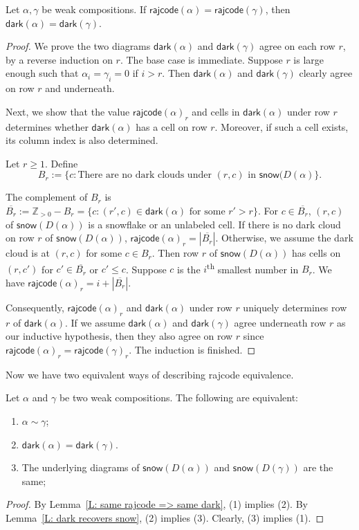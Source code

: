 \documentclass[ALCO]{cedram}
\newcommand{\dark}{\mathsf{dark}}
\newcommand{\snow}{\mathsf{snow}}
\newcommand{\rajcode}{\mathsf{rajcode}}
\begin{document}
\begin{lemma}
\label{L: same rajcode => same dark}
Let $\alpha, \gamma$ be weak compositions.
If $\rajcode(\alpha) = \rajcode(\gamma)$,
then $\dark(\alpha) = \dark(\gamma)$.
\end{lemma}
\begin{proof}
We prove the two diagrams $\dark(\alpha)$ 
and $\dark(\gamma)$ agree on each row $r$,
by a reverse induction on $r$.
The base case is immediate.
Suppose $r$ is large enough
such that $\alpha_i = \gamma_i = 0$
if $i > r$.
Then $\dark(\alpha)$ and $\dark(\gamma)$
clearly agree on row $r$ and underneath.

Next, we show that the value $\rajcode(\alpha)_r$ and cells in $\dark(\alpha)$ under row $r$ 
determines whether $\dark(\alpha)$ has a cell on row $r$.
Moreover, if such a cell exists, its column index is also determined. 

Let $r\geqslant 1$.
Define
$$B_r :=\{c: \textrm{There are no dark clouds under } (r,c) \textrm{ in } \snow(D(\alpha) \}.$$

The complement of $B_r$ is $\overline{B_r} := \mathbb{Z}_{>0} - B_r = \{c: (r',c) \in \dark(\alpha) \textrm{ for some } r' > r \}$.
For $c \in \overline{B_r}$,
$(r,c)$ of $\snow(D(\alpha))$ is a snowflake or an unlabeled cell.
If there is no dark cloud on row $r$ of $\snow(D(\alpha))$,
$\rajcode(\alpha)_r = |\overline{B_r}|$.
Otherwise, we assume the dark cloud is at $(r,c)$ for some $c \in B_r$.
Then row $r$ of $\snow(D(\alpha))$ has cells on 
$(r,c')$ for $c' \in \overline{B_r}$ or $c' \leq c$.
Suppose $c$ is the $i$\textsuperscript{th} smallest number in $B_r$.
We have $\rajcode(\alpha)_r = i + |\overline{B_r}|$.

Consequently, $\rajcode(\alpha)_r$ and $\dark(\alpha)$ under row $r$
uniquely determines row $r$ of $\dark(\alpha)$.
If we assume $\dark(\alpha)$ and $\dark(\gamma)$
agree underneath row $r$ as our inductive hypothesis,
then they also agree on row $r$ since $\rajcode(\alpha)_r = \rajcode(\gamma)_r$.
The induction is finished. 
\end{proof}

Now we have two equivalent ways of describing rajcode equivalence.
\begin{prop}
\label{P: equivalence}
Let $\alpha$ and $\gamma$ be two weak compositions. 
The following are equivalent:
\begin{enumerate}
\item $\alpha \sim \gamma$;
\item $\dark(\alpha) = \dark(\gamma)$.
\item The underlying diagrams of $\snow(D(\alpha))$ and  $\snow(D(\gamma))$
are the same;
\end{enumerate}
\end{prop}
\begin{proof}
By Lemma~\ref{L: same rajcode => same dark}, (1) implies (2).
By Lemma~\ref{L: dark recovers snow}, (2) implies (3).
Clearly, (3) implies (1).
\end{proof}
\end{document}
